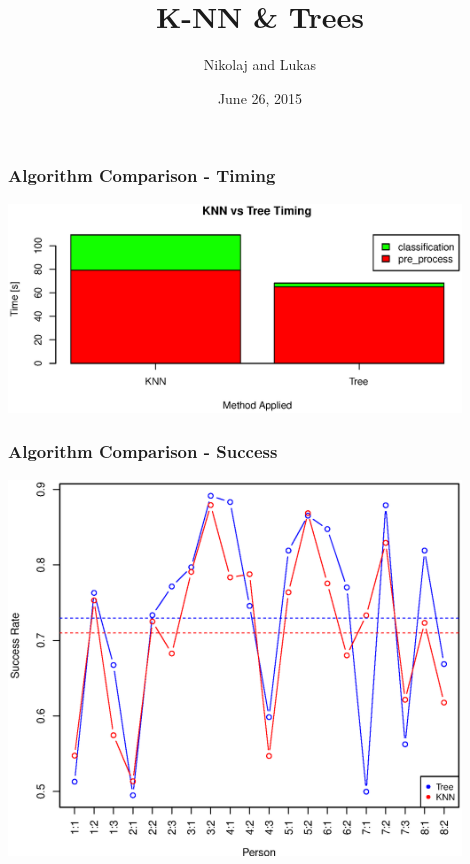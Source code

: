 \documentclass[12pt,a4paper]{beamer}
\begin{document}
\begin{frame}
\author{Nikolaj and Lukas}
\date{June 26, 2015}
\title{K-NN \& Trees}
\maketitle
\end{frame}

\centering



% 
% 
% 
% 
% 
% 



\begin{frame}
\frametitle{Algorithm Comparison - Timing}
\includegraphics[width=0.9\textwidth]{../report/graphics/algo_compare_timing}
\end{frame}

\begin{frame}
\frametitle{Algorithm Comparison - Success}
\includegraphics[width=0.9\textwidth]{../report/graphics/success_comp_hard}
\end{frame}
\end{document}
